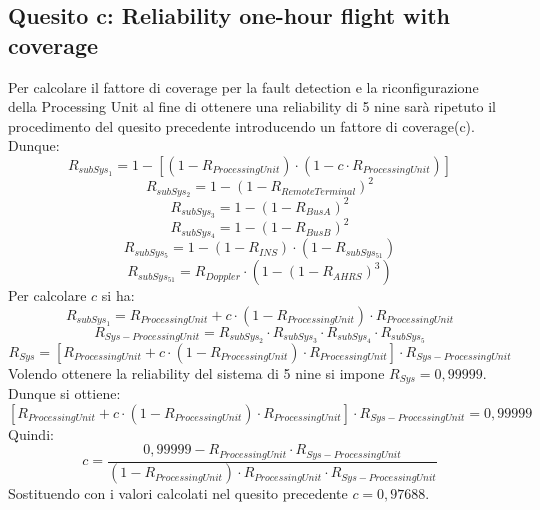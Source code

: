 \subsection{Quesito c: Reliability one-hour flight with coverage}

Per calcolare il fattore di coverage per la fault detection e la riconfigurazione
della Processing Unit al fine di ottenere una reliability di 5 nine sarà ripetuto
il procedimento del quesito precedente introducendo un fattore di coverage(c).\\
Dunque:
$$R_{subSys_1} = 1 -[ (1 - R_{ProcessingUnit}) \cdot (1-c\cdot R_{ProcessingUnit})]$$
$$R_{subSys_2} = 1 - (1 - R_{RemoteTerminal})^2$$
$$R_{subSys_3} = 1 - (1 - R_{BusA})^2$$
$$R_{subSys_4} = 1 - (1 - R_{BusB})^2$$
$$R_{subSys_5} = 1 - (1 - R_{INS}) \cdot (1 - R_{subSys_51})$$
$$R_{subSys_51} = R_{Doppler} \cdot (1 - (1 - R_{AHRS})^3)$$
Per calcolare $c$ si ha:
$$R_{subSys_1} = R_{ProcessingUnit}+c\cdot(1-R_{ProcessingUnit} )\cdot R_{ProcessingUnit}$$
$$R_{Sys-ProcessingUnit} =  R_{subSys_2} \cdot R_{subSys_3} \cdot R_{subSys_4} \cdot R_{subSys_5}$$
$$R_{Sys}=[R_{ProcessingUnit}+c\cdot(1-R_{ProcessingUnit})\cdot R_{ProcessingUnit}]\cdot R_{Sys-ProcessingUnit}$$
Volendo ottenere la reliability del sistema di 5 nine si impone $R_{Sys}=0,99999$.\\
Dunque si ottiene:
$$[R_{ProcessingUnit}+c\cdot(1-R_{ProcessingUnit})\cdot R_{ProcessingUnit}]\cdot R_{Sys-ProcessingUnit}=0,99999$$
Quindi:
$$ c = \frac{0,99999-R_{ProcessingUnit}\cdot R_{Sys-ProcessingUnit}}{(1-R_{ProcessingUnit})\cdot R_{ProcessingUnit} \cdot R_{Sys-ProcessingUnit}}$$
Sostituendo con i valori calcolati nel quesito precedente $c=0,97688$.\\
